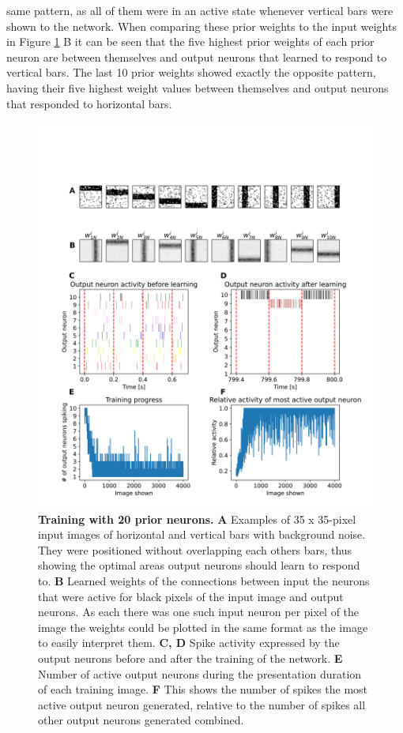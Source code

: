 same pattern, as all of them were in an active state whenever vertical bars were shown to the network. When comparing these prior weights to the input weights in Figure \ref{fig:horvertAdaptiveInhibitionTraining} B it can be seen that the five highest prior weights of each prior neuron are between themselves and output neurons that learned to respond to vertical bars. The last 10 prior weights showed exactly the opposite pattern, having their five highest weight values between themselves and output neurons that responded to horizontal bars.

\begin{figure}
  \includegraphics[width=\linewidth]{figures/horvertAdaptiveInh/trainingPlot.png}
  \caption{\textbf{Training with 20 prior neurons.} \textbf{A} Examples of 35 x 35-pixel input images of horizontal and vertical bars with background noise. They were positioned without overlapping each others bars, thus showing the optimal areas output neurons should learn to respond to. \textbf{B} Learned weights of the connections between input the neurons that were active for black pixels of the input image and output neurons. As each there was one such input neuron per pixel of the image the weights could be plotted in the same format as the image to easily interpret them. \textbf{C, D} Spike activity expressed by the output neurons before and after the training of the network. \textbf{E} Number of active output neurons during the presentation duration of each training image. \textbf{F} This shows the number of spikes the most active output neuron generated, relative to the number of spikes all other output neurons generated combined. }
  \label{fig:horvertAdaptiveInhibitionTraining}
\end{figure}


